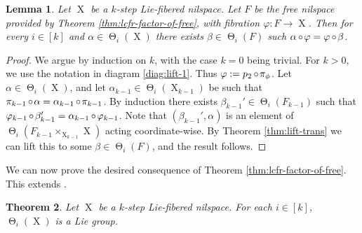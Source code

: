 \documentclass[a4paper,12pt,reqno]{amsart}
\newtheorem{theorem}{Theorem}[section]
\newtheorem{lemma}[theorem]{Lemma}
\theoremstyle{definition}
\def\to{\rightarrow}
\DeclareMathOperator{\tran}{\Theta}
\DeclareMathOperator{\ns}{X}
\DeclareMathOperator{\co}{\circ\hspace{-0.02 cm}}
\begin{document}
\begin{lemma}\label{lem:lift-tran-to-free}
Let $\ns$ be a $k$-step Lie-fibered nilspace. Let $F$ be the free nilspace provided by Theorem \ref{thm:lcfr-factor-of-free}, with fibration $\varphi:F\to \ns$. Then for every $i\in[k]$ and $\alpha\in \tran_i(\ns)$ there exists $\beta\in \tran_i(F)$ such   $\alpha\co\varphi = \varphi\co\beta$.
\end{lemma}

\begin{proof}
We argue by induction on $k$, with the case $k=0$ being trivial. For $k>0$, we use the notation in diagram \eqref{diag:lift-1}. Thus $\varphi := p_2\co \pi_\phi$. Let $\alpha\in \tran_i(\ns)$, and let $\alpha_{k-1}\in\tran_i(\ns_{k-1})$ be such that $\pi_{k-1}\co\alpha = \alpha_{k-1}\co \pi_{k-1}$. By induction there exists $\beta_{k-1}'\in\tran_i(F_{k-1})$ such that $\varphi_{k-1}\co \beta'_{k-1} = \alpha_{k-1}\co \varphi_{k-1}$. Note that  $(\beta_{k-1}',\alpha)$ is an element of $\tran_i( F_{k-1}\times_{\ns_{k-1}} \ns)$ acting coordinate-wise. By Theorem \ref{thm:lift-trans} we can lift this to some $\beta\in \tran_i(F)$, and the result follows.
\end{proof}
\noindent We can now prove the desired consequence of Theorem \ref{thm:lcfr-factor-of-free}. This extends \cite[Theorem 2.9.10]{Cand:Notes2}.
\begin{theorem}\label{thm:LFnstransLie}
Let $\ns$ be a $k$-step Lie-fibered nilspace. For each $i\in [k]$, $\tran_i(\ns)$ is a Lie group.
\end{theorem}
\end{document}
